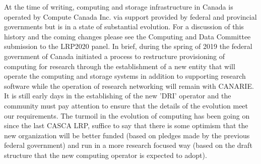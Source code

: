 \documentclass[11pt]{article}
\begin{document}
At the time of writing, computing and storage infrastructure in Canada is operated by Compute Canada Inc. via support provided by federal and provincial governments but is in a state of substantial evolution.  For a discussion of this history and the coming changes please see the Computing and Data Committee submission to the LRP2020 panel.  
In brief, during the spring of 2019 the federal government of Canada initiated a process to restructure provisioning of computing for research through the establishment of a new entity that will operate the computing and storage systems in addition to supporting research software while the operation of research networking will remain with CANARIE.  
It is still early days in the establishing of the new 'DRI' operator and the community must pay attention to ensure that the details of the evolution meet our requirements.  The turmoil in the evolution of computing has been going on since the last CASCA LRP, suffice to say that there is some optimism that the new organization will be better funded (based on pledges made by the previous federal government) and run in a more research focused way (based on the draft structure that the new computing operator is expected to adopt). 

\end{document}
